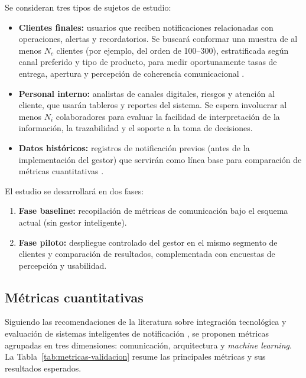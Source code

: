 \documentclass[conference]{IEEEtran}
\begin{document}
Se consideran tres tipos de sujetos de estudio:
\begin{itemize}
  \item \textbf{Clientes finales:} usuarios que reciben notificaciones relacionadas con operaciones, alertas y recordatorios. Se buscar{\'a} conformar una muestra de al menos $N_c$ clientes (por ejemplo, del orden de 100--300), estratificada seg{\'u}n canal preferido y tipo de producto, para medir oportunamente tasas de entrega, apertura y percepci{\'o}n de coherencia comunicacional \cite{torres2020,twilio2023}.
  \item \textbf{Personal interno:} analistas de canales digitales, riesgos y atenci{\'o}n al cliente, que usar{\'a}n tableros y reportes del sistema. Se espera involucrar al menos $N_i$ colaboradores para evaluar la facilidad de interpretaci{\'o}n de la informaci{\'o}n, la trazabilidad y el soporte a la toma de decisiones.
  \item \textbf{Datos hist{\'o}ricos:} registros de notificaci{\'o}n previos (antes de la implementaci{\'o}n del gestor) que servir{\'a}n como l{\'i}nea base para comparaci{\'o}n de m{\'e}tricas cuantitativas \cite{rahimi2021}.
\end{itemize}

El estudio se desarrollar{\'a} en dos fases:
\begin{enumerate}
  \item \textbf{Fase baseline:} recopilaci{\'o}n de m{\'e}tricas de comunicaci{\'o}n bajo el esquema actual (sin gestor inteligente).
  \item \textbf{Fase piloto:} despliegue controlado del gestor en el mismo segmento de clientes y comparaci{\'o}n de resultados, complementada con encuestas de percepci{\'o}n y usabilidad.
\end{enumerate}

\subsection{M{\'e}tricas cuantitativas}

Siguiendo las recomendaciones de la literatura sobre integraci{\'o}n tecnol{\'o}gica y evaluaci{\'o}n de sistemas inteligentes de notificaci{\'o}n \cite{rahimi2021,yancey2020,prabhakar2022}, se proponen m{\'e}tricas agrupadas en tres dimensiones: comunicaci{\'o}n, arquitectura y \textit{machine learning}. La Tabla~\ref{tab:metricas-validacion} resume las principales m{\'e}tricas y sus resultados esperados.
\end{document}
